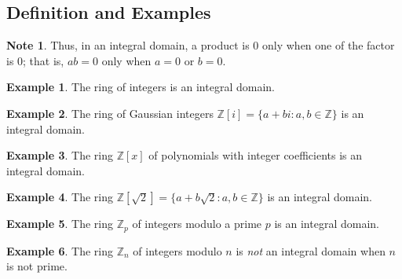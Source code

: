 \documentclass{article}
\theoremstyle{definition}
\newtheorem{definition}{Definition}[section]
\newtheorem{example}{Example}[section]
\newtheorem{note}{Note}[section]
\begin{document}
\subsection{Definition and Examples}

\noindent{}

\begin{note}
    Thus, in an integral domain, a product is 0 only when one of the factor is 0; that is, $ab=0$ only when $a=0$ or $b=0$.
\end{note}

\begin{example}
    The ring of integers is an integral domain.
\end{example}

\begin{example}
    The ring of Gaussian integers $\mathbb{Z}[i]=\{a+bi:a,b\in\mathbb{Z}\}$ is an integral domain.
\end{example}

\begin{example}
    The ring $\mathbb{Z}[x]$ of polynomials with integer coefficients is an integral domain.
\end{example}

\begin{example}
    The ring $\mathbb{Z}[\sqrt{2}]=\{a+b\sqrt{2}:a,b\in\mathbb{Z}\}$ is an integral domain.
\end{example}

\begin{example}
    The ring $\mathbb{Z}_p$ of integers modulo a prime $p$ is an integral domain.
\end{example}

\begin{example}
    The ring $\mathbb{Z}_n$ of integers modulo $n$ is \textit{not} an integral domain when $n$ is not prime.
\end{example}
\end{document}
